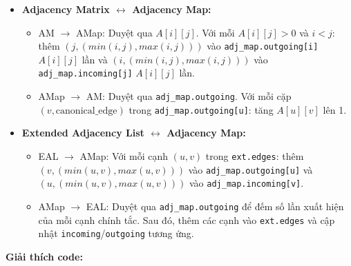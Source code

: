 \documentclass{article}
\begin{document}
\begin{itemize}
    \item \textbf{Adjacency Matrix $\leftrightarrow$ Adjacency Map:}
    \begin{itemize}
        \item AM $\to$ AMap: Duyệt qua $A[i][j]$. Với mỗi $A[i][j] > 0$ và $i < j$: thêm $(j, (min(i,j), max(i,j)))$ vào \texttt{adj\_map.outgoing[i]} $A[i][j]$ lần và $(i, (min(i,j), max(i,j)))$ vào \texttt{adj\_map.incoming[j]} $A[i][j]$ lần.
        \item AMap $\to$ AM: Duyệt qua \texttt{adj\_map.outgoing}. Với mỗi cặp $(v, \text{canonical\_edge})$ trong \texttt{adj\_map.outgoing[u]}: tăng $A[u][v]$ lên 1.
    \end{itemize}
    \item \textbf{Extended Adjacency List $\leftrightarrow$ Adjacency Map:}
    \begin{itemize}
        \item EAL $\to$ AMap: Với mỗi cạnh $(u,v)$ trong \texttt{ext.edges}: thêm $(v, (min(u,v), max(u,v)))$ vào \texttt{adj\_map.outgoing[u]} và $(u, (min(u,v), max(u,v)))$ vào \texttt{adj\_map.incoming[v]}.
        \item AMap $\to$ EAL: Duyệt qua \texttt{adj\_map.outgoing} để đếm số lần xuất hiện của mỗi cạnh chính tắc. Sau đó, thêm các cạnh vào \texttt{ext.edges} và cập nhật \texttt{incoming}/\texttt{outgoing} tương ứng.
    \end{itemize}
\end{itemize}

\textbf{Giải thích code:}
\end{document}
